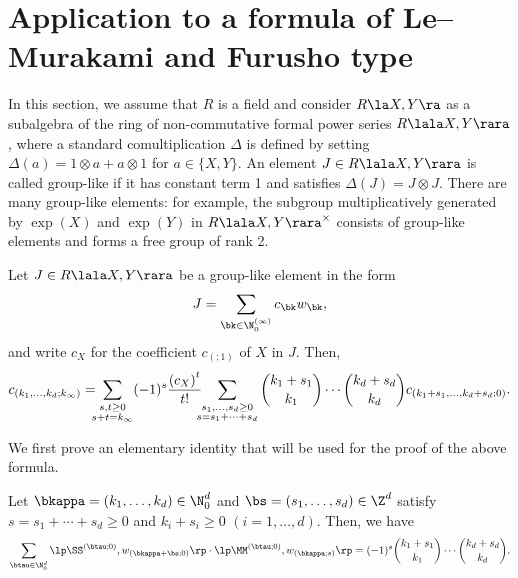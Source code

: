 \section{Application to a formula of Le--Murakami and Furusho type}

In this section, we assume that $R$ is a field and consider 
$R\la X,Y\ra$ as a subalgebra of the ring of non-commutative
formal power series $R\lala X,Y\rara$, where a standard
comultiplication $\Delta$ is defined by setting
$\Delta(a)=1\otimes a+a\otimes 1$ for $a\in\{X,Y\}$.  
An element $J\in R\lala X,Y\rara$ is called group-like if
it has constant term 1 and satisfies $\Delta(J)=J\otimes J$. 
There are many group-like elements: 
for example, the subgroup multiplicatively generated by $\exp(X)$ and $\exp(Y)$
in $R\lala X,Y\rara^\times$ consists of group-like elements and forms a free group of rank 2. 

\begin{Theorem}
\label{LeMuFu}
Let $J\in R\lala X,Y\rara$ be a group-like element in the form
$$
J=\sum_{\bk\in\N_0^{(\infty)}} c_\bk w_\bk,
$$
and write $c_X$ for the coefficient $c_{(;1)}$ of $X$ in $J$. 
Then,
$$
c_{(k_1,\dots,k_d;k_\infty)}= \hspace{-0.2cm} \sum_{\substack{s,t\ge 0 \\ s+t=k_\infty}}
(-1)^s
\frac{{(c_X)}^t}{t!}
\hspace{-0.2cm} \sum_{\substack{ s_1,\dots,s_d\ge 0 \\ s=s_1+\dots+s_d}}
\binom{k_1+s_1}{k_1}\cdots \binom{k_d+s_d}{k_d}
c_{(k_1+s_1,\dots,k_d+s_d;0)}.
$$
\end{Theorem}


We first prove an elementary identity that will be used for the proof of the above formula.

\begin{Lemma} \label{lem2}
Let $\bkappa=(k_1,\dots,k_d)\in\N_0^d$ and $\bs=(s_1,\dots,s_d)\in \Z^d$
satisfy $s=s_1+\cdots+s_d\ge 0$ and $k_i+s_i\ge 0$ $(i=1,\dots,d)$.
Then,  we have
$$
\sum_{\btau\in\N_0^d} 
\lp\SS^{(\btau;0)},w_{(\bkappa+\bs;0)}\rp
\cdot \lp\MM^{(\btau;0)}, w_{(\bkappa;s)}\rp
=(-1)^s
\binom{k_1+s_1}{k_1}\cdots \binom{k_d+s_d}{k_d}.
$$
\end{Lemma}

